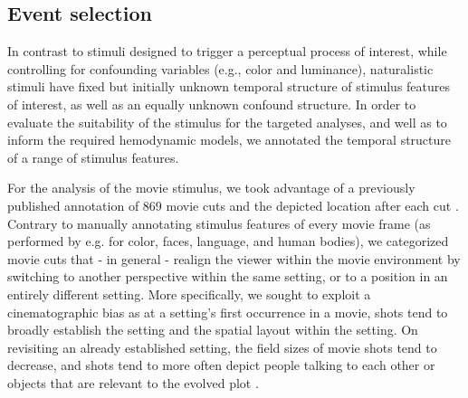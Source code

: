 \documentclass[english]{article}
\begin{document}
\subsection{Event selection} \label{rationale}

In contrast to stimuli designed to trigger a perceptual process of interest,
while controlling for confounding variables (e.g., color and luminance),
naturalistic stimuli have fixed but initially unknown temporal structure of
stimulus features of interest, as well as an equally unknown confound structure.
In order to evaluate the suitability of the stimulus for the targeted analyses,
and well as to inform the required hemodynamic models, we annotated the temporal
structure of a range of stimulus features.

For the analysis of the movie stimulus, we took advantage of a previously
published annotation of 869 movie cuts and the depicted location after each cut
\citep{haeusler2016cutanno}.
Contrary to manually annotating stimulus features of every movie frame (as
performed by e.g. \cite{bartels2004mapping} for color, faces, language, and
human bodies), we categorized movie cuts that - in general - realign the viewer
within the movie environment by switching to another perspective within the
same setting, or to a position in an entirely different setting.
More specifically, we sought to exploit a cinematographic bias as
at a setting's first occurrence in a movie, shots tend to broadly establish the
setting and the spatial layout within the setting.
On revisiting an already established setting, the field sizes of movie shots
tend to decrease, and shots tend to more often depict people talking to each
other or objects that are relevant to the evolved plot
\citep{brown2012cinematography, katz1991film, mascelli1998five}.

\end{document}
